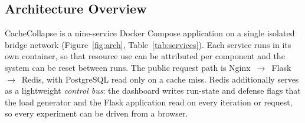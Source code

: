 \documentclass[preprint,12pt]{elsarticle}
\begin{document}
\subsection{Architecture Overview}
CacheCollapse is a nine-service Docker Compose application on a single isolated bridge
network (Figure~\ref{fig:arch}, Table~\ref{tab:services}). Each service runs in its
own container, so that resource use can be attributed per component and the system
can be reset between runs. The public request path is
Nginx~$\rightarrow$~Flask~$\rightarrow$~Redis, with PostgreSQL read only on a cache
miss. Redis additionally serves as a lightweight \emph{control bus}: the dashboard
writes run-state and defense flags that the load generator and the Flask application
read on every iteration or request, so every experiment can be driven from a browser.
\end{document}
